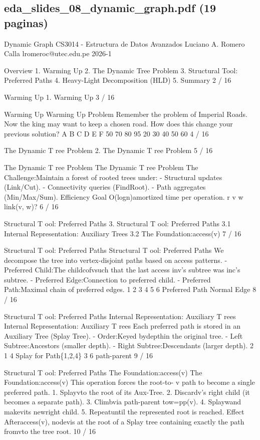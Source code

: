 \subsection*{eda\_slides\_08\_dynamic\_graph.pdf (19 paginas)}
\begin{description}[leftmargin=!,labelwidth=4.2em,style=nextline]
\item[Pag. 1] Dynamic Graph CS3014 - Estructura de Datos Avanzados Luciano A. Romero Calla lromeroc@utec.edu.pe 2026-1
\item[Pag. 2] Overview 1. Warming Up 2. The Dynamic Tree Problem 3. Structural Tool: Preferred Paths 4. Heavy-Light Decomposition (HLD) 5. Summary 2 / 16
\item[Pag. 3] Warming Up 1. Warming Up 3 / 16
\item[Pag. 4] Warming Up Warming Up Problem Remember the problem of Imperial Roads. Now the king may want to keep a chosen road. How does this change your previous solution? A B C D E F 50 70 80 95 20 30 40 50 60 4 / 16
\item[Pag. 5] The Dynamic T ree Problem 2. The Dynamic T ree Problem 5 / 16
\item[Pag. 6] The Dynamic T ree Problem The Dynamic T ree Problem The Challenge:Maintain a forest of rooted trees under: - Structural updates (Link/Cut). - Connectivity queries (FindRoot). - Path aggregates (Min/Max/Sum). Efficiency Goal O(logn)amortized time per operation. r v w link(v, w)? 6 / 16
\item[Pag. 7] Structural T ool: Preferred Paths 3. Structural T ool: Preferred Paths 3.1 Internal Representation: Auxiliary Trees 3.2 The Foundation:access(v) 7 / 16
\item[Pag. 8] Structural T ool: Preferred Paths Structural T ool: Preferred Paths We decompose the tree into vertex-disjoint paths based on access patterns. - Preferred Child:The childcofvsuch that the last access inv's subtree was inc's subtree. - Preferred Edge:Connection to preferred child. - Preferred Path:Maximal chain of preferred edges. 1 2 3 4 5 6 Preferred Path Normal Edge 8 / 16
\item[Pag. 9] Structural T ool: Preferred Paths Internal Representation: Auxiliary T rees Internal Representation: Auxiliary T rees Each preferred path is stored in an Auxiliary Tree (Splay Tree). - Order:Keyed bydepthin the original tree. - Left Subtree:Ancestors (smaller depth). - Right Subtree:Descendants (larger depth). 2 1 4 Splay for Path\{1,2,4\} 3 6 path-parent 9 / 16
\item[Pag. 10] Structural T ool: Preferred Paths The Foundation:access(v) The Foundation:access(v) This operation forces the root-to- v path to become a single preferred path. 1. Splayvto the root of its Aux-Tree. 2. Discardv's right child (it becomes a separate path). 3. Climbvia path-parent tow=pp(v). 4. Splaywand makevits newright child. 5. Repeatuntil the represented root is reached. Effect Afteraccess(v), nodevis at the root of a Splay tree containing exactly the path fromvto the tree root. 10 / 16

\end{description}
